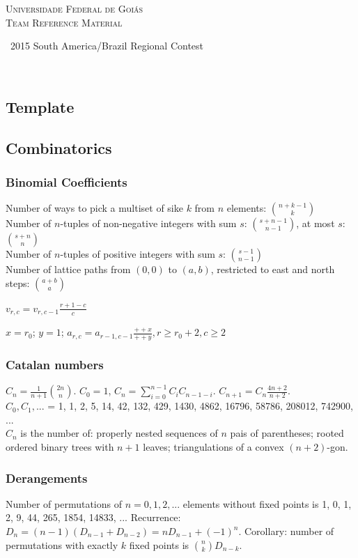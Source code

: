 \documentclass[a4paper,12pt]{article}
\newcommand\includesfile[4]{
  \subsection{#2}
  \begin{multicols}{2}
    
  \end{multicols}
}
\begin{document}
\thispagestyle{fancy}
\begin{center}
  \Huge\textsc{Universidade Federal de Goiás \\ Team Reference Material}
  
  \
  \small 2015 South America/Brazil Regional Contest
\end{center}

\begin{multicols}{2}
  \tableofcontents
\end{multicols}

\

\includesfile{c++}{Template}{config}{template.cpp}

\subsection{Combinatorics}
\subsubsection{Binomial Coefficients}

Number of ways to pick a multiset of sike $k$ from $n$ elements: $\binom{n+k-1}{k}$\\
Number of $n$-tuples of non-negative integers with sum $s$: $\binom{s+n-1}{n-1}$, at most $s$: $\binom{s+n}{n}$\\
Number of $n$-tuples of positive integers with sum $s$: $\binom{s-1}{n-1}$\\
Number of lattice paths from $(0,0)$ to $(a,b)$, restricted to east and north steps: $\binom{a+b}{a}$

$v_{r,c} = v_{r,c-1} \frac{r+1-c}{c}$

$x = r_0$; $y = 1$; $a_{r,c} = a_{r-1,c-1}  \frac{++x}{++y}, r \geq r_0+2, c \geq 2$

\subsubsection{Catalan numbers}
$C_{n} = \frac{1}{n+1}\binom{2n}{n}$. $C_0 = 1$,  $C_{n} = \sum_{i=0}^{n-1}C_iC_{n-1-i}$. $C_{n+1} = C_{n}\frac{4n+2}{n+2}$.\\
$C_0,C_1,... $ = 1, 1, 2, 5, 14, 42, 132, 429, 1430, 4862, 16796, 58786, 208012, 742900, ...\\
$C_{n}$ is the number of: properly nested sequences of $n$ pais of parentheses; rooted ordered binary trees with $n+1$ leaves; triangulations of a convex $(n+2)$-gon.

\subsubsection{Derangements}
Number of permutations of $n = 0,1,2,...$ elements without fixed points is 1, 0, 1, 2, 9, 44, 265, 1854, 14833, ... Recurrence: $D_{n} = (n-1)(D_{n-1} + D_{n-2}) = nD_{n-1} + (-1)^{n}$.
Corollary: number of permutations with exactly $k$ fixed points is $\binom{n}{k}D_{n-k}$.
\end{document}
